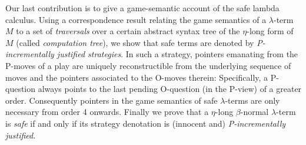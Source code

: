 \documentclass{llncs}
\begin{document}
Our last contribution is to give a game-semantic account of the safe
lambda calculus.
%
Using a correspondence result relating the game semantics of a
$\lambda$-term $M$ to a set of \emph{traversals} \cite{OngLics2006}
over a certain abstract syntax tree of the $\eta$-long form of $M$
(called \emph{computation tree}), we show that safe terms are denoted
by \emph{P-incrementally justified strategies}. In such a strategy,
pointers emanating from the P-moves of a play are uniquely
reconstructible from the underlying sequence of moves and the pointers
associated to the O-moves therein: Specifically, a P-question always
points to the last pending O-question (in the P-view) of a greater
order. Consequently pointers in the game semantics of safe
$\lambda$-terms are only necessary from order 4 onwards. Finally we
prove that a $\eta$-long $\beta$-normal $\lambda$-term is \emph{safe}
if and only if its strategy denotation is (innocent and)
\emph{P-incrementally justified}.
\end{document}
